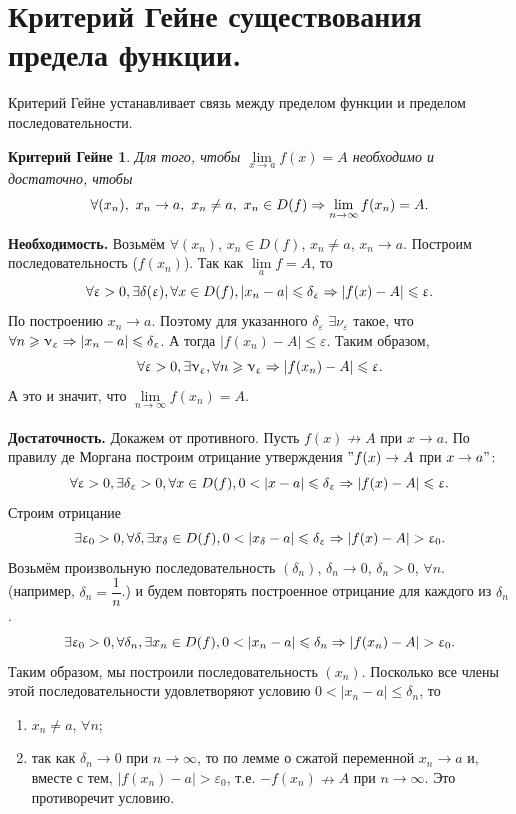 \section{Критерий Гейне существования предела функции.}
Критерий Гейне устанавливает связь между пределом функции и пределом последовательности.
\newtheorem*{gayne}{Критерий Гейне}
\begin{gayne}
	Для того, чтобы $\lim\limits_{x\to a}f(x) = A$ необходимо и достаточно, чтобы $$\forall(x_n),\ x_n\rightarrow a,\ x_n\neq a,\ x_n\in D(f) \Ra \lim\limits_{n\to\infty}f(x_n)=A.$$
\end{gayne}
\begin{Proof}
	\textbf{Необходимость.}
	Возьмём $\forall(x_n)$, $x_n\in D(f)$, $x_n\neq a$, $x_n\rightarrow a$. Построим последовательность ($f(x_n)$). Так как $\lim\limits_{a}f = A$, то
	$$\forall\upvarepsilon>0, \exists\delta(\upvarepsilon), \forall x\in D(f), |x_n-a|\leqslant\delta_\upvarepsilon\Rightarrow|f(x)-A|\leqslant\upvarepsilon.$$
	По построению $x_n\rightarrow a$. Поэтому для указанного $\delta_\varepsilon$ $\exists\nu_\varepsilon$ такое, что $\forall n \geqslant\upnu_\upvarepsilon\Rightarrow |x_n-a|\leqslant\delta_\upvarepsilon$. А тогда $|f(x_n)-A|\leqslant\varepsilon$.
	Таким образом,
	$$\forall\upvarepsilon>0, \exists\upnu_\upvarepsilon, \forall n\geqslant\upnu_\upvarepsilon\Rightarrow|f(x_n)-A|\leqslant\upvarepsilon.$$
	А это и значит, что $\lim\limits_{n\to\infty}f(x_n) = A$.\\\\
	\textbf{Достаточность.}
	Докажем от противного. Пусть $f(x)\nrightarrow A$ при $x\rightarrow a$. По правилу де Моргана построим отрицание утверждения $"f(x)\rightarrow A$ при $x\rightarrow a"$:
	$$\forall\varepsilon>0, \exists\delta_\varepsilon>0,\forall x\in D(f), 0<|x-a|\leqslant\delta_\varepsilon\Ra|f(x)-A|\leqslant\varepsilon.$$
	Строим отрицание
	$$\exists\varepsilon_0>0, \forall\delta,\exists x_\delta\in D(f), 0<|x_\delta-a|\leqslant\delta_\varepsilon\Ra|f(x)-A|>\varepsilon_0.$$
	Возьмём произвольную последовательность $(\delta_n)$, $\delta_n\rightarrow0$, $\delta_n>0$, $\forall n$. (например, $\delta_n = \dfrac{1}{n}$.) и будем повторять построенное отрицание для каждого из $\delta_n$.
	$$\exists\varepsilon_0>0,\forall\delta_n,\exists x_n\in D(f), 0<|x_n-a|\leqslant\delta_n\Ra |f(x_n)-A|>\varepsilon_0.$$
	Таким образом, мы построили последовательность $(x_n)$. Посколько все члены этой последовательности удовлетворяют условию $0<|x_n-a|\leqslant\delta_n$, то\begin{enumerate}
		\item $x_n\neq a$, $\forall n$;
		\item так как $\delta_n\rightarrow0$ при $n\rightarrow\infty$, то по лемме о сжатой переменной $x_n\rightarrow a$ и, вместе с тем, $|f(x_n)-a|>\varepsilon_0$, т.е. $-f(x_n)\nrightarrow A$ при $n\rightarrow\infty$. Это противоречит условию.
	\end{enumerate}
\end{Proof}
